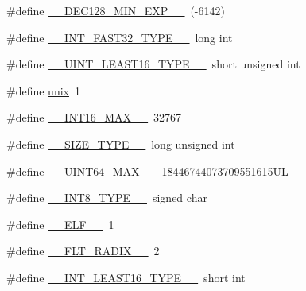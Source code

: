 \begin{DoxyCompactItemize}
\item 
\#define \hyperlink{build-analizer__host-_desktop___qt__5__9__0___g_c_c__64bit-_release_2moc__predefs_8h_a748143fe17201c420b868b8f30c57d59}{\+\_\+\+\_\+\+D\+E\+C128\+\_\+\+M\+I\+N\+\_\+\+E\+X\+P\+\_\+\+\_\+}~(-\/6142)
\item 
\#define \hyperlink{build-analizer__host-_desktop___qt__5__9__0___g_c_c__64bit-_release_2moc__predefs_8h_a4e1f76417ed810f038c277a5aba691fa}{\+\_\+\+\_\+\+I\+N\+T\+\_\+\+F\+A\+S\+T32\+\_\+\+T\+Y\+P\+E\+\_\+\+\_\+}~long int
\item 
\#define \hyperlink{build-analizer__host-_desktop___qt__5__9__0___g_c_c__64bit-_release_2moc__predefs_8h_a64a27148d4e67c4ae167442c7dc92a0a}{\+\_\+\+\_\+\+U\+I\+N\+T\+\_\+\+L\+E\+A\+S\+T16\+\_\+\+T\+Y\+P\+E\+\_\+\+\_\+}~short unsigned int
\item 
\#define \hyperlink{build-analizer__host-_desktop___qt__5__9__0___g_c_c__64bit-_release_2moc__predefs_8h_a4e65214f450ef6326b96b52e6dd5714b}{unix}~1
\item 
\#define \hyperlink{build-analizer__host-_desktop___qt__5__9__0___g_c_c__64bit-_release_2moc__predefs_8h_afc45bfe4241907d615bb96ed6f4fd142}{\+\_\+\+\_\+\+I\+N\+T16\+\_\+\+M\+A\+X\+\_\+\+\_\+}~32767
\item 
\#define \hyperlink{build-analizer__host-_desktop___qt__5__9__0___g_c_c__64bit-_release_2moc__predefs_8h_ab8d03bfd9e9120480015fc51dc8b8e65}{\+\_\+\+\_\+\+S\+I\+Z\+E\+\_\+\+T\+Y\+P\+E\+\_\+\+\_\+}~long unsigned int
\item 
\#define \hyperlink{build-analizer__host-_desktop___qt__5__9__0___g_c_c__64bit-_release_2moc__predefs_8h_a9f8e418d5a6f916ffe36f250fb99d7bc}{\+\_\+\+\_\+\+U\+I\+N\+T64\+\_\+\+M\+A\+X\+\_\+\+\_\+}~18446744073709551615\+U\+L
\item 
\#define \hyperlink{build-analizer__host-_desktop___qt__5__9__0___g_c_c__64bit-_release_2moc__predefs_8h_ae9a1914a564951612704f3f6630663f3}{\+\_\+\+\_\+\+I\+N\+T8\+\_\+\+T\+Y\+P\+E\+\_\+\+\_\+}~signed char
\item 
\#define \hyperlink{build-analizer__host-_desktop___qt__5__9__0___g_c_c__64bit-_release_2moc__predefs_8h_a4012402899bd689646e39a043ccb6047}{\+\_\+\+\_\+\+E\+L\+F\+\_\+\+\_\+}~1
\item 
\#define \hyperlink{build-analizer__host-_desktop___qt__5__9__0___g_c_c__64bit-_release_2moc__predefs_8h_ae9ed936cc90c092e15526478bdbbefe0}{\+\_\+\+\_\+\+F\+L\+T\+\_\+\+R\+A\+D\+I\+X\+\_\+\+\_\+}~2
\item 
\#define \hyperlink{build-analizer__host-_desktop___qt__5__9__0___g_c_c__64bit-_release_2moc__predefs_8h_a6f2032bd7e6248b526a2c13e37c7b972}{\+\_\+\+\_\+\+I\+N\+T\+\_\+\+L\+E\+A\+S\+T16\+\_\+\+T\+Y\+P\+E\+\_\+\+\_\+}~short int

\end{DoxyCompactItemize}
